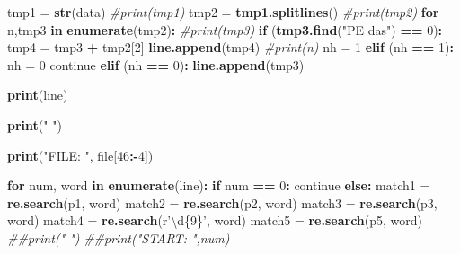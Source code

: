 \documentclass[
  12pt,
]{article}
\newenvironment{Shaded}{\begin{snugshade}}{\end{snugshade}}
\newcommand{\CommentTok}[1]{\textcolor[rgb]{0.56,0.35,0.01}{\textit{#1}}}
\newcommand{\ControlFlowTok}[1]{\textcolor[rgb]{0.13,0.29,0.53}{\textbf{#1}}}
\newcommand{\DecValTok}[1]{\textcolor[rgb]{0.00,0.00,0.81}{#1}}
\newcommand{\KeywordTok}[1]{\textcolor[rgb]{0.13,0.29,0.53}{\textbf{#1}}}
\newcommand{\NormalTok}[1]{#1}
\newcommand{\OperatorTok}[1]{\textcolor[rgb]{0.81,0.36,0.00}{\textbf{#1}}}
\newcommand{\StringTok}[1]{\textcolor[rgb]{0.31,0.60,0.02}{#1}}
\begin{document}
\begin{Shaded}
\begin{Highlighting}[]
\NormalTok{    tmp1 =}\StringTok{ }\KeywordTok{str}\NormalTok{(data)}
    \CommentTok{#print(tmp1)}
\NormalTok{    tmp2 =}\StringTok{ }\KeywordTok{tmp1.splitlines}\NormalTok{()}
    \CommentTok{#print(tmp2)}
    \ControlFlowTok{for}\NormalTok{ n,tmp3 }\ControlFlowTok{in} \KeywordTok{enumerate}\NormalTok{(tmp2)}\OperatorTok{:}
\StringTok{        }\CommentTok{#print(tmp3)}
\StringTok{        }\ControlFlowTok{if}\NormalTok{ (}\KeywordTok{tmp3.find}\NormalTok{(}\StringTok{"PE das"}\NormalTok{) }\OperatorTok{==}\StringTok{ }\DecValTok{0}\NormalTok{)}\OperatorTok{:}
\StringTok{            }\NormalTok{tmp4 =}\StringTok{ }\NormalTok{tmp3 }\OperatorTok{+}\StringTok{ }\NormalTok{tmp2[}\DecValTok{2}\NormalTok{]}
            \KeywordTok{line.append}\NormalTok{(tmp4)}
            \CommentTok{#print(n)}
\NormalTok{            nh =}\StringTok{ }\DecValTok{1}
        \KeywordTok{elif}\NormalTok{ (nh }\OperatorTok{==}\StringTok{ }\DecValTok{1}\NormalTok{)}\OperatorTok{:}
\StringTok{            }\NormalTok{nh =}\StringTok{ }\DecValTok{0}
\NormalTok{            continue}
        \KeywordTok{elif}\NormalTok{ (nh }\OperatorTok{==}\StringTok{ }\DecValTok{0}\NormalTok{)}\OperatorTok{:}
\StringTok{            }\KeywordTok{line.append}\NormalTok{(tmp3)}

    \KeywordTok{print}\NormalTok{(line)}

    \KeywordTok{print}\NormalTok{(}\StringTok{"   "}\NormalTok{)}

    \KeywordTok{print}\NormalTok{(}\StringTok{"FILE: "}\NormalTok{, file[}\DecValTok{46}\OperatorTok{:-}\DecValTok{4}\NormalTok{])}

    \ControlFlowTok{for}\NormalTok{ num, word }\ControlFlowTok{in} \KeywordTok{enumerate}\NormalTok{(line)}\OperatorTok{:}
\StringTok{            }\ControlFlowTok{if}\NormalTok{ num }\OperatorTok{==}\StringTok{ }\DecValTok{0}\OperatorTok{:}
\StringTok{                }\NormalTok{continue}
            \ControlFlowTok{else}\OperatorTok{:}
\StringTok{                }\NormalTok{match1 =}\StringTok{ }\KeywordTok{re.search}\NormalTok{(p1, word)}
\NormalTok{                match2 =}\StringTok{ }\KeywordTok{re.search}\NormalTok{(p2, word)}
\NormalTok{                match3 =}\StringTok{ }\KeywordTok{re.search}\NormalTok{(p3, word)}
\NormalTok{                match4 =}\StringTok{ }\KeywordTok{re.search}\NormalTok{(r}\StringTok{'\textbackslash{}d\{9\}'}\NormalTok{, word)}
\NormalTok{                match5 =}\StringTok{ }\KeywordTok{re.search}\NormalTok{(p5, word)}
                \CommentTok{##print("   ")}
                \CommentTok{##print("START: ",num)}


\end{Highlighting}
\end{Shaded}
\end{document}
